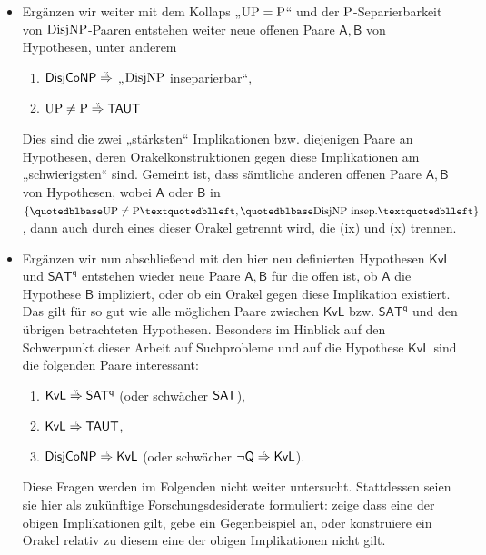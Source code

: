 \begin{itemize}[parsep=0pt,listparindent=\parindent,itemsep=5pt plus 1pt minus 1pt,midpenalty=0]
    \item Ergänzen wir weiter mit dem Kollaps „$\UP=\P$“ und der $\P$-Separierbarkeit von $\DisjNP$-Paaren entstehen weiter neue offenen Paare $\mathsf{A,B}$ von Hypothesen, unter anderem
        \begin{enumerate}[noitemsep,resume,label=(\roman*)]
            \item $\hDisjCoNP\stackrel{\smash{\text{\raisebox{-1pt}{\tiny ?}}}}{\Rightarrow}$ „$\DisjNP$ inseparierbar“,
            \item $\UP\neq\P\stackrel{\smash{\text{\raisebox{-1pt}{\tiny ?}}}}{\Rightarrow} \hTAUT$
        \end{enumerate}
        Dies sind die zwei „stärksten“ Implikationen bzw. diejenigen Paare an Hypothesen, deren Orakelkonstruktionen gegen diese Implikationen am „schwierigsten“ sind. Gemeint ist, dass sämtliche anderen offenen Paare $\mathsf{A,B}$ von Hypothesen, wobei $\mathsf{A}$ oder $\mathsf{B}$ in $\{„\UP\neq\P“, „\DisjNP\text{ insep.}“\}$, dann auch durch eines dieser Orakel getrennt wird, die (ix) und (x) trennen.

    \item Ergänzen wir nun abschließend mit den hier neu definierten Hypothesen $\mathsf{KvL}$ und $\mathsf{SAT^{q}}$ entstehen wieder neue Paare $\mathsf{A,B}$ für die offen ist, ob $\mathsf A$ die Hypothese $\mathsf B$ impliziert, oder ob ein Orakel gegen diese Implikation existiert. Das gilt für so gut wie alle möglichen Paare zwischen $\mathsf{KvL}$ bzw. $\mathsf{SAT^{q}}$ und den übrigen betrachteten Hypothesen. 
        Besonders im Hinblick auf den Schwerpunkt dieser Arbeit auf Suchprobleme und auf die Hypothese $\mathsf{KvL}$ sind die folgenden Paare interessant:
        \begin{enumerate}[noitemsep,resume,label=(\roman*)]
            \item $\mathsf{KvL}\stackrel{\smash{\text{\raisebox{-1pt}{\tiny ?}}}}{\Rightarrow}\mathsf{SAT^{q}}$ (oder schwächer $\hSAT$),
            \item $\mathsf{KvL}\stackrel{\smash{\text{\raisebox{-1pt}{\tiny ?}}}}{\Rightarrow}\hTAUT$,
            \item $\hDisjCoNP\stackrel{\smash{\text{\raisebox{-1pt}{\tiny ?}}}}{\Rightarrow}\mathsf{KvL}$ (oder schwächer $\neg\hQ\stackrel{\smash{\text{\raisebox{-1pt}{\tiny ?}}}}{\Rightarrow}\mathsf{KvL}$).
        \end{enumerate}
        Diese Fragen werden im Folgenden nicht weiter untersucht. Stattdessen seien sie hier als zukünftige Forschungsdesiderate formuliert: zeige dass eine der obigen Implikationen gilt, gebe ein Gegenbeispiel an, oder konstruiere ein Orakel relativ zu diesem eine der obigen Implikationen nicht gilt.


\end{itemize}
